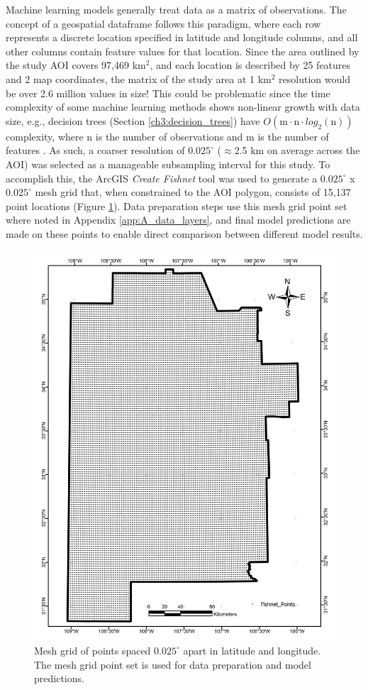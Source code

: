 Machine learning models generally treat data as a matrix of observations. The concept of a geospatial dataframe follows this paradigm, where each row represents a discrete location specified in latitude and longitude columns, and all other columns contain feature values for that location. Since the area outlined by the study AOI covers 97,469 km$^2$, and each location is described by 25 features and 2 map coordinates, the matrix of the study area at 1 km$^2$ resolution would be over 2.6 million values in size! This could be problematic since the time complexity of some machine learning methods shows non-linear growth with data size, e.g., decision trees (Section \ref{ch3:decision_trees}) have $O(\text{m} \cdot \text{n} \cdot log_2(\text{n}))$ complexity, where n is the number of observations and m is the number of features \citep{sani_computational_2018}. As such, a coarser resolution of $0.025^\circ$ ($\approx$2.5 km on average across the AOI) was selected as a manageable subsampling interval for this study. To accomplish this, the ArcGIS \textit{Create Fishnet} tool was used to generate a $0.025^\circ$ x $0.025^\circ$ mesh grid that, when constrained to the AOI polygon, consists of 15,137 point locations (Figure \ref{fig:meshgrid}). Data preparation steps use this mesh grid point set where noted in Appendix \ref{app:A_data_layers}, and final model predictions are made on these points to enable direct comparison between different model results. 

\begin{figure}
\centering
\includegraphics[width=0.75\linewidth]{templates/images/Figure-Fishnet.pdf}
\caption[Mesh grid point set]{Mesh grid of points spaced $0.025^\circ$ apart in latitude and longitude. The mesh grid point set is used for data preparation and model predictions.} 
\label{fig:meshgrid}
\end{figure}

